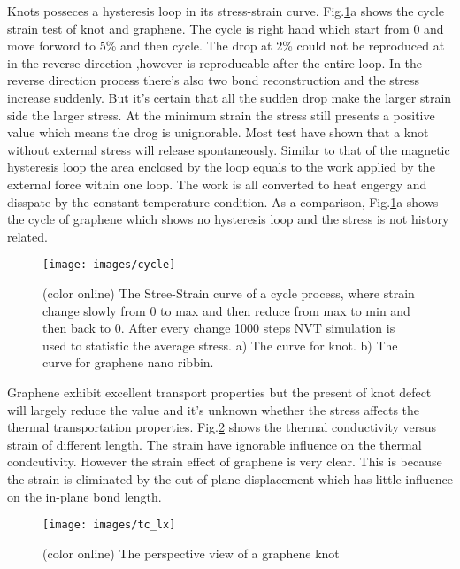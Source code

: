 \documentclass[%
 reprint,
 amsmath,amssymb,
 aps,
prb,
]{revtex4-1}
\begin{document}
Knots posseces a hysteresis loop in its stress-strain curve. Fig.\ref{fig:cycle}a shows the cycle strain test of knot and graphene. The cycle is right hand which start from 0 and move forword to 5\% and then cycle. The drop at 2\% could not be reproduced at in the  reverse direction ,however is reproducable after the entire loop. In the reverse direction process there's also two bond reconstruction and the stress increase suddenly. But it's certain that all the sudden drop make the larger strain side the larger stress. At the minimum strain the stress still presents a positive value which means the drog is unignorable. Most test have shown that a knot without external stress will release spontaneously. Similar to that of the magnetic hysteresis loop the area enclosed by the loop equals to the work applied by the external force within one loop. The work is all converted to heat engergy and disspate by the constant temperature condition.
As a comparison,  Fig.\ref{fig:cycle}a shows the cycle of graphene which shows no hysteresis loop and the stress is not history related.

\begin{figure}[b]
  \texttt{[image: images/cycle]}
  \caption{\label{fig:cycle}  (color online) The Stree-Strain curve of a cycle process, where strain change slowly from 0 to max and then reduce from max to min and then back to 0. After every change 1000 steps NVT simulation is used to statistic the average stress. a) The curve for knot. b) The curve for graphene nano ribbin.}
\end{figure}

Graphene exhibit excellent transport properties but the present of knot defect will largely reduce the value and it's unknown whether the stress affects the thermal transportation properties. Fig.\ref{fig:tc_lx} shows the
thermal conductivity versus strain of different length. The strain have ignorable influence on the thermal condcutivity. However the strain effect of graphene is very clear. This is because the strain is eliminated by the out-of-plane displacement which has little influence on the in-plane bond length.
\begin{figure}[b]
  \texttt{[image: images/tc\_lx]}
  \caption{\label{fig:tc_lx}  (color online) The perspective view of a graphene knot}
\end{figure}
\end{document}

